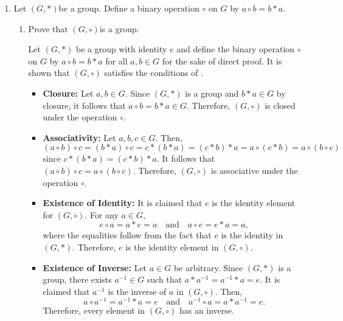 \begin{enumerate}
\begin{subprove}
    Since $\phi$ is a bijection and preserves the group operation,
    it is concluded by definition of  that $\phi$ is an isomorphism from $G$ to $G$.
  \end{subprove}



  \newpage
  



  \item Let $(G, *)$be a group. Define a binary operation $\circ$ on $G$ by $a \circ b=b * a$.
  \begin{enumerate}
    \item Prove that $(G, \circ)$is a group.
    \begin{subprove}
      Let $(G, *)$ be a group with identity $e$ and define the binary operation $\circ$ on $G$ by $a \circ b = b * a$ for all $a, b \in G$ for the sake of direct proof.
      It is shown that $(G, \circ)$ satisfies the conditions of .
      
      \begin{itemize}
        \item \textbf{Closure:} Let $a, b \in G$.
        Since $(G, *)$ is a group and $b * a \in G$ by closure,
        it follows that $a \circ b = b * a \in G$.
        Therefore, $(G, \circ)$ is closed under the operation $\circ$.
        
        \item \textbf{Associativity:} Let $a, b, c \in G$.
        Then,
        \[
          (a \circ b) \circ c = (b * a) \circ c = c * (b * a) = (c * b) * a = a \circ (c * b)=a \circ (b \circ c)
        \]
        since $c * (b * a) = (c * b) * a$. It follows that $(a \circ b) \circ c = a \circ (b \circ c)$.
        Therefore, $(G, \circ)$ is associative under the operation $\circ$.
        
        \item \textbf{Existence of Identity:} It is claimed that $e$ is the identity element for $(G, \circ)$.
        For any $a \in G$,
        \[
          e \circ a = a * e = a \quad \text{and} \quad a \circ e = e * a = a,
        \]
        where the equalities follow from the fact that $e$ is the identity in $(G, *)$.
        Therefore, $e$ is the identity element in $(G, \circ)$.
        
        \item \textbf{Existence of Inverse:} Let $a \in G$ be arbitrary.
        Since $(G, *)$ is a group, there exists $a^{-1} \in G$ such that $a * a^{-1} = a^{-1} * a = e$.
        It is claimed that $a^{-1}$ is the inverse of $a$ in $(G, \circ)$.
        Then,
        \[
          a \circ a^{-1} = a^{-1} * a = e \quad \text{and} \quad a^{-1} \circ a = a * a^{-1} = e.
        \]
        Therefore, every element in $(G, \circ)$ has an inverse.
      \end{itemize}
      

\end{subprove}
\end{enumerate}
\end{enumerate}
